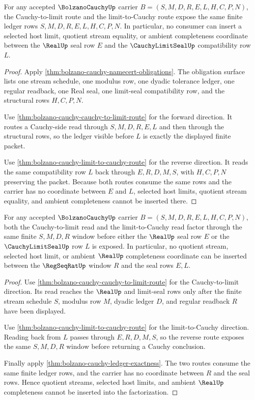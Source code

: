 \begin{theorem}
\label{thm:bolzano-cauchy-ledger-exactness}
For any accepted $\BolzanoCauchyUp$ carrier $B=(S,M,D,R,E,L,H,C,P,N)$, the Cauchy-to-limit route and the limit-to-Cauchy route expose the same finite ledger rows $S,M,D,R,E,L,H,C,P,N$. In particular, no consumer can insert a selected host limit, quotient stream equality, or ambient completeness coordinate between the $\RealUp$ seal row $E$ and the $\CauchyLimitSealUp$ compatibility row $L$.
\end{theorem}
\begin{proof}
Apply \autoref{thm:bolzano-cauchy-namecert-obligations}. The obligation surface lists one stream schedule, one modulus row, one dyadic tolerance ledger, one regular readback, one Real seal, one limit-seal compatibility row, and the structural rows $H,C,P,N$.

Use \autoref{thm:bolzano-cauchy-cauchy-to-limit-route} for the forward direction. It routes a Cauchy-side read through $S,M,D,R,E,L$ and then through the structural rows, so the ledger visible before $L$ is exactly the displayed finite packet.

Use \autoref{thm:bolzano-cauchy-limit-to-cauchy-route} for the reverse direction. It reads the same compatibility row $L$ back through $E,R,D,M,S$, with $H,C,P,N$ preserving the packet. Because both routes consume the same rows and the carrier has no coordinate between $E$ and $L$, selected host limits, quotient stream equality, and ambient completeness cannot be inserted there.
\end{proof}

\begin{theorem}
\label{thm:bolzano-cauchy-regseqrat-window-factorization}
For any accepted $\BolzanoCauchyUp$ carrier $B=(S,M,D,R,E,L,H,C,P,N)$, both the Cauchy-to-limit read and the limit-to-Cauchy read factor through the same finite $S,M,D,R$ window before either the $\RealUp$ seal row $E$ or the $\CauchyLimitSealUp$ row $L$ is exposed. In particular, no quotient stream, selected host limit, or ambient $\RealUp$ completeness coordinate can be inserted between the $\RegSeqRatUp$ window $R$ and the seal rows $E,L$.
\end{theorem}
\begin{proof}
Use \autoref{thm:bolzano-cauchy-cauchy-to-limit-route} for the Cauchy-to-limit direction. Its read reaches the $\RealUp$ and limit-seal rows only after the finite stream schedule $S$, modulus row $M$, dyadic ledger $D$, and regular readback $R$ have been displayed.

Use \autoref{thm:bolzano-cauchy-limit-to-cauchy-route} for the limit-to-Cauchy direction. Reading back from $L$ passes through $E,R,D,M,S$, so the reverse route exposes the same $S,M,D,R$ window before returning a Cauchy conclusion.

Finally apply \autoref{thm:bolzano-cauchy-ledger-exactness}. The two routes consume the same finite ledger rows, and the carrier has no coordinate between $R$ and the seal rows. Hence quotient streams, selected host limits, and ambient $\RealUp$ completeness cannot be inserted into the factorization.
\end{proof}

